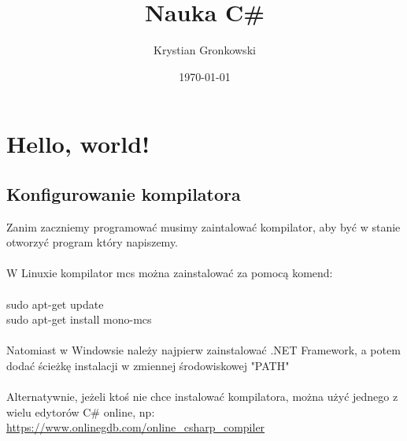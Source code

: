 \documentclass[a4paper]{article}
\title{Nauka C\#}
\author{Krystian Gronkowski}
\date{\today}
\theoremstyle{definition}
\begin{document}

\maketitle
\tableofcontents

\pagebreak
\section{Hello, world!}
\subsection{Konfigurowanie kompilatora}
Zanim zaczniemy programować musimy zaintalować kompilator, aby być w stanie otworzyć program który napiszemy.
\\\\W Linuxie kompilator mcs można zainstalować za pomocą komend:
\\\\sudo apt-get update
\\sudo apt-get install mono-mcs
\\\\Natomiast w Windowsie należy najpierw zainstalować .NET Framework, a potem dodać ścieżkę instalacji w zmiennej środowiskowej "PATH"
\\\\Alternatywnie, jeżeli ktoś nie chce instalować kompilatora, można użyć jednego z wielu edytorów C\# online, np: \url{https://www.onlinegdb.com/online_csharp_compiler}
\end{document}
